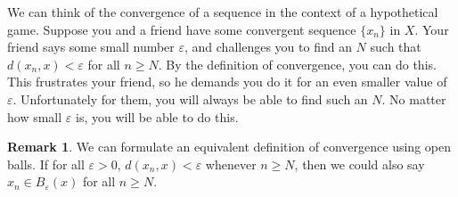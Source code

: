 \documentclass{article}
\theoremstyle{definition}
\newtheorem{remark}{Remark}[section]
\begin{document}
	We can think of the convergence of a sequence in the context of a hypothetical game. Suppose you and a friend have some convergent sequence $ \{x_n\} $ in $ X $. Your friend says some small number $ \varepsilon $, and challenges you to find an $ N $ such that $ d(x_n,x)<\varepsilon $ for all $ n\ge N $. By the definition of convergence, you can do this. This frustrates your friend, so he demands you do it for an even smaller value of $ \varepsilon $. Unfortunately for them, you will always be able to find such an $ N $. No matter how small $ \varepsilon $ is, you will be able to do this. 
	\begin{remark}
		We can formulate an equivalent definition of convergence using open balls. If for all  $ \varepsilon>0 $, $ d(x_n,x)<\varepsilon $ whenever $ n\ge N $, then we could also say $ x_n\in B_\varepsilon(x) $ for all $ n\ge N $. 
	\end{remark}
	
\end{document}
